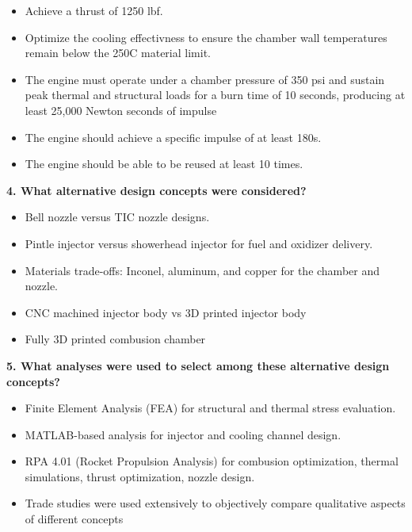 \begin{itemize}
    \item Achieve a thrust of 1250 lbf.
    \item Optimize the cooling effectivness to ensure the chamber wall temperatures remain below the 250C material limit.
    \item The engine must operate under a chamber pressure of 350 psi and sustain peak thermal and structural loads for a burn time of 10 seconds, producing at least 25,000 Newton seconds of impulse
    \item The engine should achieve a specific impulse of at least 180s. 
    \item The engine should be able to be reused at least 10 times. 

\end{itemize}

\textbf{4. What alternative design concepts were considered?}

\begin{itemize}
    \item Bell nozzle versus TIC nozzle designs.
    \item Pintle injector versus showerhead injector for fuel and oxidizer delivery.
    \item Materials trade-offs: Inconel, aluminum, and copper for the chamber and nozzle.
    \item CNC machined injector body vs 3D printed injector body
    \item Fully 3D printed combusion chamber
\end{itemize}

\textbf{5. What analyses were used to select among these alternative design concepts?}

\begin{itemize}
    \item Finite Element Analysis (FEA) for structural and thermal stress evaluation.
    \item MATLAB-based analysis for injector and cooling channel design.
    \item RPA 4.01 (Rocket Propulsion Analysis) for combusion optimization, thermal simulations, thrust optimization, nozzle design. 
    \item Trade studies were used extensively to objectively compare qualitative aspects of different concepts
\end{itemize}

